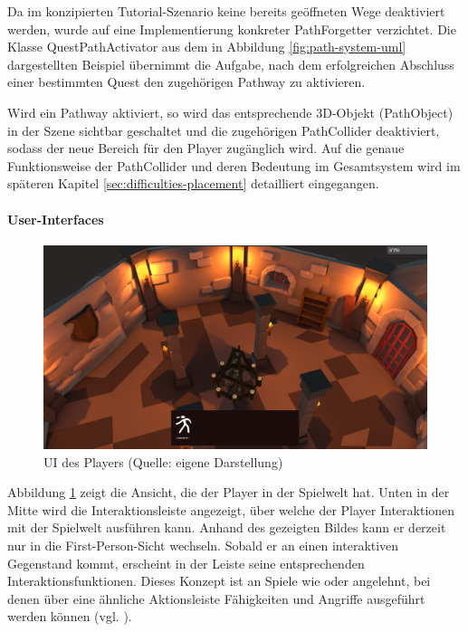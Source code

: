 Da im konzipierten Tutorial-Szenario keine bereits geöffneten Wege deaktiviert werden, wurde auf eine Implementierung konkreter PathForgetter verzichtet. Die Klasse QuestPathActivator aus dem in Abbildung \ref{fig:path-system-uml} dargestellten Beispiel übernimmt die Aufgabe, nach dem erfolgreichen Abschluss einer bestimmten Quest den zugehörigen Pathway zu aktivieren.

Wird ein Pathway aktiviert, so wird das entsprechende \ac{3D}-Objekt (PathObject) in der Szene sichtbar geschaltet und die zugehörigen PathCollider deaktiviert, sodass der neue Bereich für den Player zugänglich wird. Auf die genaue Funktionsweise der PathCollider und deren Bedeutung im Gesamtsystem wird im späteren Kapitel \ref{sec:difficulties-placement} detailliert eingegangen.

\paragraph{User-Interfaces}

\begin{figure}[ht]
\centering
\includegraphics[width=1\linewidth]{content/pictures/UI.PNG}
\caption{UI des Players (Quelle: eigene Darstellung)}
\label{fig:player-ui}
\end{figure}

Abbildung \ref{fig:player-ui} zeigt die Ansicht, die der Player in der Spielwelt hat. Unten in der Mitte wird die Interaktionsleiste angezeigt, über welche der Player Interaktionen mit der Spielwelt ausführen kann. Anhand des gezeigten Bildes kann er derzeit nur in die First-Person-Sicht wechseln. Sobald er an einen interaktiven Gegenstand kommt, erscheint in der Leiste seine entsprechenden Interaktionsfunktionen. Dieses Konzept ist an Spiele wie  oder  angelehnt, bei denen über eine ähnliche Aktionsleiste Fähigkeiten und Angriffe ausgeführt werden können  (vgl. \citealp{blizzard_entertainment_diablo_2023,larian_studios_baldurs_2023}).

